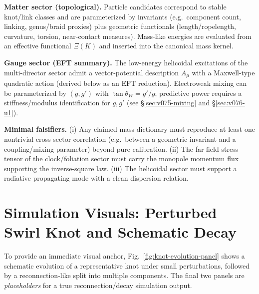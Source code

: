 \documentclass[10pt]{article}
\begin{document}
\medskip
\noindent\textbf{Matter sector (topological).}
Particle candidates correspond to stable knot/link classes and are parameterized by
invariants (e.g.\ component count, linking, genus/braid proxies) plus geometric
functionals (length/ropelength, curvature, torsion, near-contact measures).
Mass-like energies are evaluated from an effective functional $\Xi(K)$
and inserted into the canonical mass kernel.

\medskip
\noindent\textbf{Gauge sector (EFT summary).}
The low-energy helicoidal excitations of the multi-director sector admit a vector-potential
description $A_\mu$ with a Maxwell-type quadratic action (derived below as an EFT reduction).
Electroweak mixing can be parameterized by $(g,g')$ with $\tan\theta_W=g'/g$; predictive power
requires a stiffness/modulus identification for $g,g'$ (see \S\ref{sec:v075-mixing} and \S\ref{sec:v076-u1}).

\medskip
\noindent\textbf{Minimal falsifiers.}
(i) Any claimed mass dictionary must reproduce at least one nontrivial cross-sector correlation
(e.g.\ between a geometric invariant and a coupling/mixing parameter) beyond pure calibration.
(ii) The far-field stress tensor of the clock/foliation sector must carry the monopole momentum flux
supporting the inverse-square law.
(iii) The helicoidal sector must support a radiative propagating mode with a clean dispersion relation.


\section{Simulation Visuals: Perturbed Swirl Knot and Schematic Decay}
\label{sec:v076-sim-visuals}

To provide an immediate visual anchor, Fig.~\ref{fig:knot-evolution-panel} shows a schematic evolution
of a representative knot under small perturbations, followed by a reconnection-like split into multiple
components. The final two panels are \emph{placeholders} for a true reconnection/decay simulation output.
\end{document}
